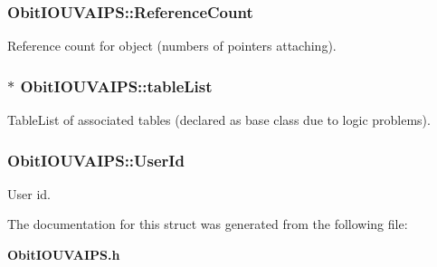 \subsubsection{ {\bf Obit\-IOUVAIPS::Reference\-Count}}\label{structObitIOUVAIPS_o2}


Reference count for object (numbers of pointers attaching). 

\subsubsection{$\ast$ {\bf Obit\-IOUVAIPS::table\-List}}\label{structObitIOUVAIPS_o9}


Table\-List of associated tables (declared as base class due to logic problems). 

\subsubsection{ {\bf Obit\-IOUVAIPS::User\-Id}}\label{structObitIOUVAIPS_o11}


User id. 



The documentation for this struct was generated from the following file:\begin{CompactItemize}
\item 
{\bf Obit\-IOUVAIPS.h}\end{CompactItemize}
